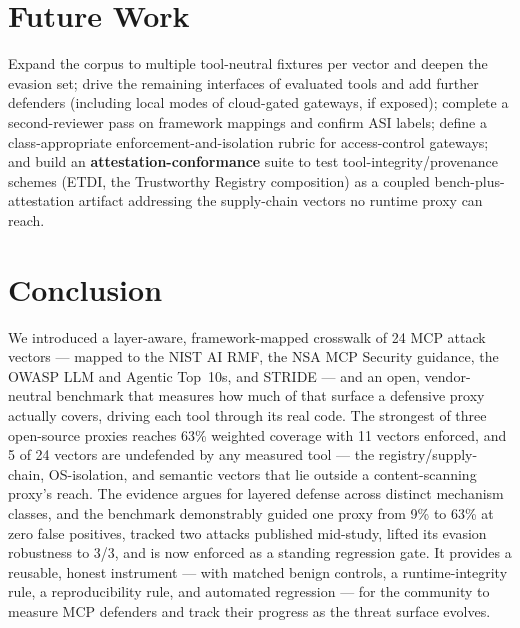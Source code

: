 \documentclass[11pt]{article}
\begin{document}
\section{Future Work}
\label{sec:future}
Expand the corpus to multiple tool-neutral fixtures per vector and deepen the evasion set; drive the remaining interfaces of evaluated tools and add further defenders (including local modes of cloud-gated gateways, if exposed); complete a second-reviewer pass on framework mappings and confirm ASI labels; define a class-appropriate enforcement-and-isolation rubric for access-control gateways; and build an \textbf{attestation-conformance} suite to test tool-integrity/provenance schemes (ETDI, the Trustworthy Registry composition) as a coupled bench-plus-attestation artifact addressing the supply-chain vectors no runtime proxy can reach.

\section{Conclusion}
\label{sec:conclusion}
We introduced a layer-aware, framework-mapped crosswalk of 24 MCP attack vectors --- mapped to the NIST AI RMF, the NSA MCP Security guidance, the OWASP LLM and Agentic Top~10s, and STRIDE --- and an open, vendor-neutral benchmark that measures how much of that surface a defensive proxy actually covers, driving each tool through its real code. The strongest of three open-source proxies reaches 63\% weighted coverage with 11 vectors enforced, and 5 of 24 vectors are undefended by any measured tool --- the registry/supply-chain, OS-isolation, and semantic vectors that lie outside a content-scanning proxy's reach. The evidence argues for layered defense across distinct mechanism classes, and the benchmark demonstrably guided one proxy from 9\% to 63\% at zero false positives, tracked two attacks published mid-study, lifted its evasion robustness to 3/3, and is now enforced as a standing regression gate. It provides a reusable, honest instrument --- with matched benign controls, a runtime-integrity rule, a reproducibility rule, and automated regression --- for the community to measure MCP defenders and track their progress as the threat surface evolves.
\end{document}
